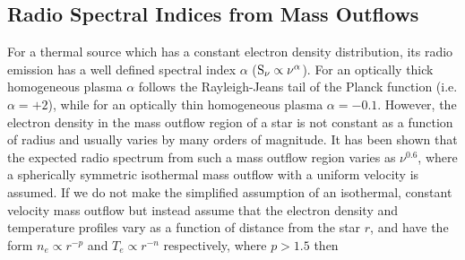 \documentclass[iop]{emulateapj}
\begin{document}
\subsection{Radio Spectral Indices from Mass Outflows} \label{disc3}
For a thermal source which has a constant electron density distribution, its radio emission has a well defined spectral index $\alpha$ ($\rm{S}_{\nu} \propto \nu ^{\alpha}$). For an optically thick homogeneous plasma $\alpha$ follows the Rayleigh-Jeans tail of the Planck function (i.e. $\alpha = +2$), while for an optically thin homogeneous plasma $\alpha = -0.1$. However, the electron density in the mass outflow region of a star is not constant as a function of radius and usually varies by many orders of magnitude. It has been shown \citep{1975MNRAS.170...41W,1975AA....39..217O,1975AA....39....1P} that the expected radio spectrum from such a mass outflow region varies as $\nu ^{0.6}$, where a spherically symmetric isothermal mass outflow with a uniform velocity is assumed. If we do not make the simplified assumption of an isothermal, constant velocity mass outflow but instead assume that the electron density and temperature profiles vary as a function of distance from the star $r$, and have the form $n_{e} \propto r^{-p}$ and $T_{e} \propto r^{-n}$ respectively, where $p > 1.5$ then 
\end{document}
